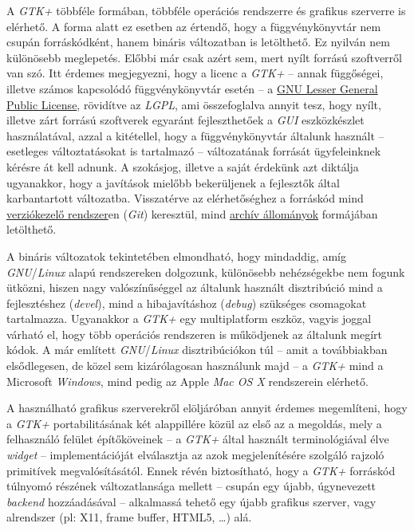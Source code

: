 A \textit{GTK+} többféle formában, többféle operációs rendszerre és grafikus szerverre is elérhető. A forma alatt ez esetben az értendő, hogy a függvénykönyvtár nem csupán forráskódként, hanem bináris  változatban is letölthető. Ez nyilván nem különösebb meglepetés. Előbbi már csak azért sem, mert nyílt forrású szoftverről van szó. Itt érdemes megjegyezni, hogy a licenc a \textit{GTK+} -- annak függőségei, illetve számos kapcsolódó függvénykönyvtár esetén -- a \href{http://www.gnu.org/licenses/lgpl-2.1.html}{GNU Lesser General Public License}, rövidítve az \textit{LGPL}, ami összefoglalva annyit tesz, hogy nyílt, illetve zárt forrású szoftverek egyaránt fejleszthetőek a \textit{GUI} eszközkészlet használatával, azzal a kitétellel, hogy a függvénykönyvtár általunk használt -- esetleges változtatásokat is tartalmazó -- változatának forrását ügyfeleinknek kérésre át kell adnunk. A szokásjog, illetve a saját érdekünk azt diktálja ugyanakkor, hogy a javítások mielőbb bekerüljenek a fejlesztők által karbantartott változatba. Visszatérve az elérhetőséghez a forráskód mind \href{http://git.gnome.org/browse/gtk+/}{verziókezelő rendszer}en (\textit{Git}) keresztül, mind \href{ftp://ftp.gtk.org/pub/gtk/}{archív állományok} formájában letölthető.

A bináris változatok tekintetében elmondható, hogy mindaddig, amíg \textit{GNU}/\textit{Linux} alapú rendszereken dolgozunk, különösebb nehézségekbe nem fogunk ütközni, hiszen nagy valószínűséggel az általunk használt disztribúció mind a fejlesztéshez (\textit{devel}), mind a hibajavításhoz (\textit{debug}) szükséges csomagokat tartalmazza. Ugyanakkor a \textit{GTK+} egy multiplatform eszköz, vagyis joggal várható el, hogy több operációs rendszeren is működjenek az általunk megírt kódok. A már említett \textit{GNU}/\textit{Linux} disztribúciókon túl -- amit a továbbiakban elsődlegesen, de közel sem kizárólagosan használunk majd -- a \textit{GTK+} mind a Microsoft \textit{Windows}, mind pedig az Apple \textit{Mac OS X} rendszerein elérhető.

A használható grafikus szerverekről elöljáróban annyit érdemes megemlíteni, hogy a \textit{GTK+} portabilitásának két alappillére közül az első az a megoldás, mely a felhasználó felület építőköveinek -- a \textit{GTK+} által használt terminológiával élve \textit{widget} -- implementációját elválasztja az azok megjelenítésére szolgáló rajzoló primitívek megvalósításától. Ennek révén biztosítható, hogy a \textit{GTK+} forráskód túlnyomó részének változatlansága mellett -- csupán egy újabb, úgynevezett \textit{backend} hozzáadásával -- alkalmassá tehető egy újabb grafikus szerver, vagy alrendszer (pl: X11, frame buffer, HTML5, \dots) alá.

